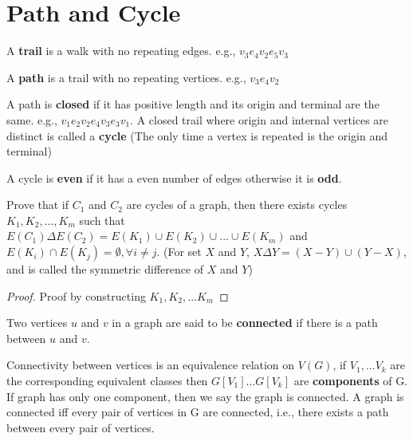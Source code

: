 		\section{Path and Cycle}
			\begin{definition}[trail]
				A \textbf{trail} is a walk with no repeating edges. e.g., $v_3e_4v_2e_5v_3$
			\end{definition}
			
			\begin{definition}[path]
				A \textbf{path} is a trail with no repeating vertices. e.g., $v_3e_4v_2$
			\end{definition}
			

			\begin{definition}
				A path is \textbf{closed} if it has positive length and its origin and terminal are the same. e.g., $v_1e_2v_2e_4v_3e_3v_1$. A closed trail where origin and internal vertices are distinct is called a \textbf{cycle} (The only time a vertex is repeated is the origin and terminal)
			\end{definition}
			
			\begin{definition}
				A cycle is \textbf{even} if it has a even number of edges otherwise it is \textbf{odd}.
			\end{definition}

			\begin{problem}
				Prove that if $C_1$ and $C_2$ are cycles of a graph, then there exists cycles $K_1, K_2, ..., K_m$ such that $E(C_1)\Delta E(C_2) = E(K_1)\cup E(K_2) \cup...\cup E(K_m)$ and $E(K_i)\cap E(K_j)=\emptyset, \forall i \neq j$. (For set $X$ and $Y$, $X\Delta Y = (X-Y)\cup(Y-X)$, and is called the symmetric difference of $X$ and $Y$)
			\end{problem}

			\begin{proof}
				Proof by constructing $K_1, K_2, ... K_m$
			\end{proof}
			
			\begin{definition}
				Two vertices $u$ and $v$ in a graph are said to be \textbf{connected} if there is a path between $u$ and $v$.
			\end{definition}
			
			\begin{definition}[component]
				Connectivity between vertices is an equivalence relation on $V(G)$, if $V_1, ... V_k$ are the corresponding equivalent classes then $G[V_1]...G[V_k]$ are \textbf{components} of G. If graph has only one component, then we say the graph is connected. A graph is connected iff every pair of vertices in G are connected, i.e., there exists a path between every pair of vertices.
			\end{definition}

